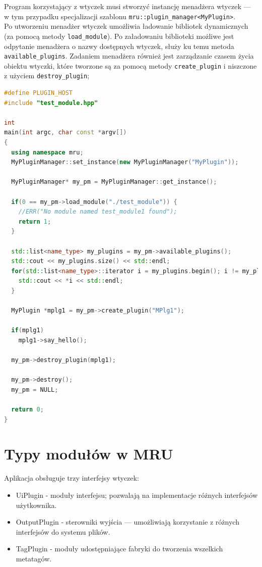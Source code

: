 \par
Program korzystający z wtyczek musi stworzyć instancję menadżera wtyczek --- w tym przypadku specjalizacji szablonu \texttt{mru::plugin\_manager<MyPlugin>}.\\
Po utworzeniu menadżer wtyczek umożliwia ładowanie bibliotek dynamicznych (za pomocą metody \texttt{load\_module}). Po załadowaniu biblioteki możliwe jest odpytanie menadżera o nazwy dostępnych wtyczek, służy ku temu metoda \texttt{available\_plugins}.
Zadaniem menadżera również jest zarządzanie czasem życia obiektu wtyczki, które tworzone są za pomocą metody \texttt{create\_plugin} i niszczone z użyciem \texttt{destroy\_plugin};
\begin{lstlisting}[caption={ main.cpp}, language=C++]
#define PLUGIN_HOST
#include "test_module.hpp"

int
main(int argc, char const *argv[])
{
  using namespace mru;
  MyPluginManager::set_instance(new MyPluginManager("MyPlugin"));

  MyPluginManager* my_pm = MyPluginManager::get_instance();

  if(0 == my_pm->load_module("./test_module")) {
    //ERR("No module named test_module1 found");
    return 1;
  }

  std::list<name_type> my_plugins = my_pm->available_plugins();
  std::cout << my_plugins.size() << std::endl;
  for(std::list<name_type>::iterator i = my_plugins.begin(); i != my_plugins.end(); ++i) {
    std::cout << *i << std::endl;
  }

  MyPlugin *mplg1 = my_pm->create_plugin("MPlg1");

  if(mplg1)
    mplg1->say_hello();

  my_pm->destroy_plugin(mplg1); 
  
  my_pm->destroy();
  my_pm = NULL;
  
  return 0;
}
\end{lstlisting}

\section{Typy modułów w MRU}
\label{moduly}
Aplikacja obsługuje trzy interfejsy wtyczek:
\begin{itemize}
\item UiPlugin - moduły interfejsu; pozwalają na implementacje różnych interfejsów użytkownika.
\item OutputPlugin - sterowniki wyjścia --- umożliwiają korzystanie z różnych interfejsów do systemu plików.
\item TagPlugin - moduły udostępniające fabryki do tworzenia wszelkich metatagów.
\end{itemize}

